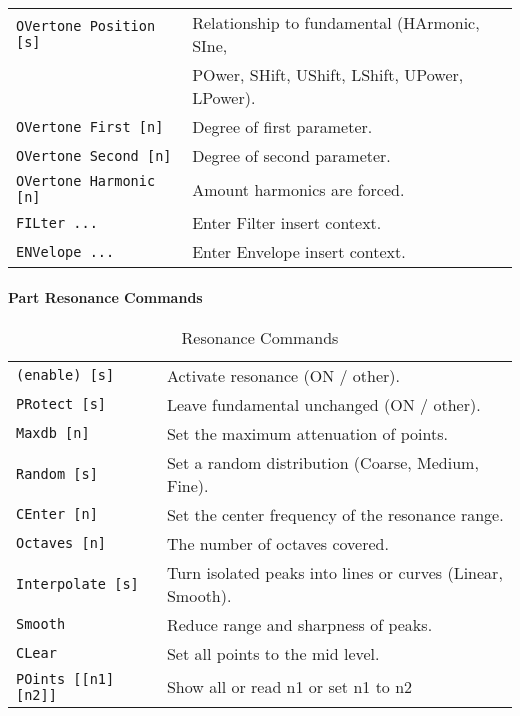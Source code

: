 \begin{table}[H]
\begin{tabular}{l l}
\texttt{OVertone Position [s]} &
   Relationship to fundamental (HArmonic, SIne,\\
\texttt{} &
   POwer, SHift, UShift, LShift, UPower, LPower).\\
\texttt{OVertone First [n]} &
   Degree of first parameter. \\
\texttt{OVertone Second [n]} &
   Degree of second parameter.   \\
\texttt{OVertone Harmonic [n]} &
   Amount harmonics are forced.  \\
\texttt{FILter ...} &
   Enter Filter insert context.  \\
\texttt{ENVelope ...} &
   Enter Envelope insert context.   \\

      \end{tabular}
   \end{table}

\paragraph{Part Resonance Commands}
\label{paragraph:command_line_part_resonance_commands}

   \begin{table}[H]
      \centering
      \caption{Resonance Commands}
      \label{table:part_resonance_commands}
      \begin{tabular}{l l}

   \texttt{(enable) [s]} &
      Activate resonance (ON / other). \\
    \texttt{PRotect [s]} &
      Leave fundamental unchanged (ON / other). \\
   \texttt{Maxdb [n]} &
      Set the maximum attenuation of points. \\
   \texttt{Random [s]} &
      Set a random distribution (Coarse, Medium, Fine). \\
   \texttt{CEnter [n]} &
      Set the center frequency of the resonance range. \\
   \texttt{Octaves [n]} &
      The number of octaves covered. \\
   \texttt{Interpolate [s]} &
      Turn isolated peaks into lines or curves (Linear, Smooth). \\
   \texttt{Smooth} &
      Reduce range and sharpness of peaks. \\
   \texttt{CLear} &
      Set all points to the mid level. \\
   \texttt{POints [[n1] [n2]]} &
      Show all or read n1 or set n1 to n2 \\

      \end{tabular}
   \end{table}

